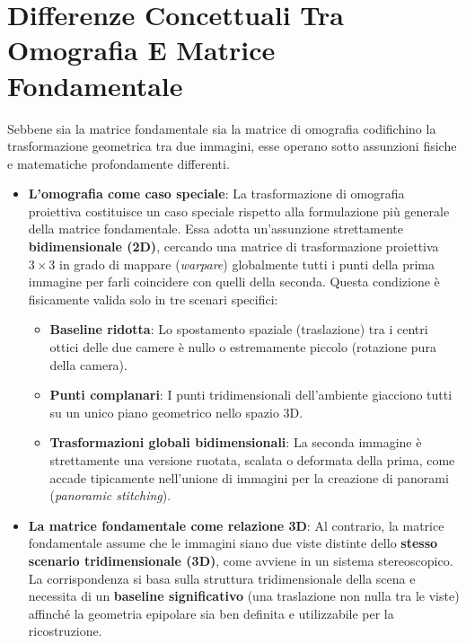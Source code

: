 ﻿\documentclass[11pt, a4paper]{article}
\begin{document}
\newpage

\section{Differenze Concettuali Tra Omografia E Matrice Fondamentale}

Sebbene sia la matrice fondamentale sia la matrice di omografia codifichino la trasformazione geometrica tra due immagini, esse operano sotto assunzioni fisiche e matematiche profondamente differenti.

\begin{itemize}
    \item \textbf{L'omografia come caso speciale}: La trasformazione di omografia proiettiva costituisce un caso speciale rispetto alla formulazione più generale della matrice fondamentale. Essa adotta un'assunzione strettamente \textbf{bidimensionale (2D)}, cercando una matrice di trasformazione proiettiva $3 \times 3$ in grado di mappare (\emph{warpare}) globalmente tutti i punti della prima immagine per farli coincidere con quelli della seconda. Questa condizione è fisicamente valida solo in tre scenari specifici:
    \begin{itemize}
        \item \textbf{Baseline ridotta}: Lo spostamento spaziale (traslazione) tra i centri ottici delle due camere è nullo o estremamente piccolo (rotazione pura della camera).
        \item \textbf{Punti complanari}: I punti tridimensionali dell'ambiente giacciono tutti su un unico piano geometrico nello spazio 3D.
        \item \textbf{Trasformazioni globali bidimensionali}: La seconda immagine è strettamente una versione ruotata, scalata o deformata della prima, come accade tipicamente nell'unione di immagini per la creazione di panorami (\emph{panoramic stitching}).
    \end{itemize}

    \item \textbf{La matrice fondamentale come relazione 3D}: Al contrario, la matrice fondamentale assume che le immagini siano due viste distinte dello \textbf{stesso scenario tridimensionale (3D)}, come avviene in un sistema stereoscopico. La corrispondenza si basa sulla struttura tridimensionale della scena e necessita di un \textbf{baseline significativo} (una traslazione non nulla tra le viste) affinché la geometria epipolare sia ben definita e utilizzabile per la ricostruzione.
\end{itemize}
\end{document}
